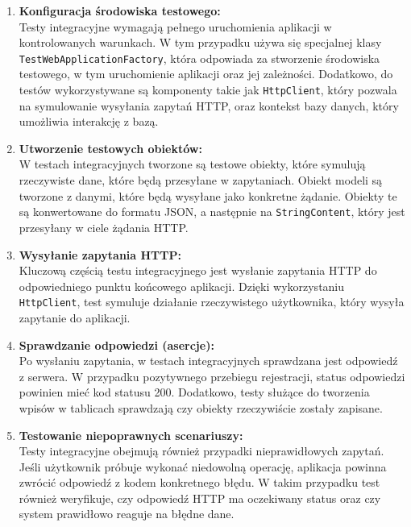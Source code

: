 \documentclass[12pt,a4paper]{article}
\begin{document}
\begin{enumerate}
    \item \textbf{Konfiguracja środowiska testowego:}\\
    Testy integracyjne wymagają pełnego uruchomienia aplikacji w kontrolowanych warunkach. W tym przypadku używa się specjalnej klasy \texttt{TestWebApplicationFactory}, która odpowiada za stworzenie środowiska testowego, w tym uruchomienie aplikacji oraz jej zależności. Dodatkowo, do testów wykorzystywane są komponenty takie jak \texttt{HttpClient}, który pozwala na symulowanie wysyłania zapytań HTTP, oraz kontekst bazy danych, który umożliwia interakcję z bazą.

    \item \textbf{Utworzenie testowych obiektów:}\\
    W testach integracyjnych tworzone są testowe obiekty, które symulują rzeczywiste dane, które będą przesyłane w zapytaniach. Obiekt modeli są tworzone z danymi, które będą wysyłane jako konkretne żądanie. Obiekty te są konwertowane do formatu JSON, a następnie na \texttt{StringContent}, który jest przesyłany w ciele żądania HTTP.

    \item \textbf{Wysyłanie zapytania HTTP:}\\
    Kluczową częścią testu integracyjnego jest wysłanie zapytania HTTP do odpowiedniego punktu końcowego aplikacji. Dzięki wykorzystaniu \texttt{HttpClient}, test symuluje działanie rzeczywistego użytkownika, który wysyła zapytanie do aplikacji.

    \item \textbf{Sprawdzanie odpowiedzi (asercje):}\\
    Po wysłaniu zapytania, w testach integracyjnych sprawdzana jest odpowiedź z serwera. W przypadku pozytywnego przebiegu rejestracji, status odpowiedzi powinien mieć kod statusu 200. Dodatkowo, testy służące do tworzenia wpisów w tablicach sprawdzają czy obiekty rzeczywiście zostały zapisane.

    \item \textbf{Testowanie niepoprawnych scenariuszy:}\\
    Testy integracyjne obejmują również przypadki nieprawidłowych zapytań. Jeśli użytkownik próbuje wykonać niedowolną operację, aplikacja powinna zwrócić odpowiedź z kodem konkretnego błędu. W takim przypadku test również weryfikuje, czy odpowiedź HTTP ma oczekiwany status oraz czy system prawidłowo reaguje na błędne dane.

\end{enumerate}
\end{document}
